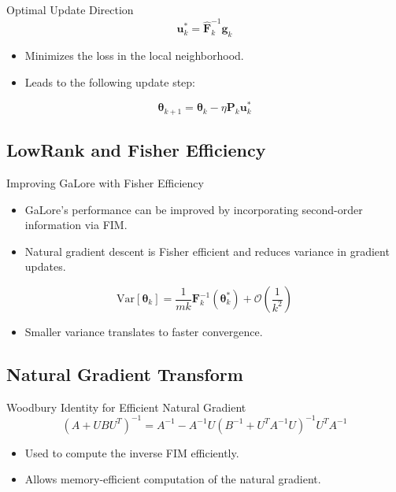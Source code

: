 \documentclass{beamer}
\begin{document}
\begin{frame}{Optimal Update Direction}
    \begin{equation}
        \mathbf{u}_k^* = \mathbf{\hat{F}}_k^{-1} \mathbf{g}_k
        \label{eq:optimal_direction}
    \end{equation}
    \begin{itemize}
        \item Minimizes the loss in the local neighborhood.
        \item Leads to the following update step:
    \end{itemize}
    \begin{equation}
        \mathbf{\theta}_{k+1} = \mathbf{\theta}_k - \eta \mathbf{P}_k \mathbf{u}_k^*
        \label{eq:gradient_descent_update}
    \end{equation}
\end{frame}

\subsection{LowRank and Fisher Efficiency}

\begin{frame}{Improving GaLore with Fisher Efficiency}
    \begin{itemize}
        \item GaLore’s performance can be improved by incorporating second-order information via FIM.
        \item Natural gradient descent is Fisher efficient and reduces variance in gradient updates.
    \end{itemize}
    \begin{equation}
        \text{Var}[\mathbf{\theta}_k] = \frac{1}{mk} \mathbf{F}_k^{-1}(\mathbf{\theta}_k^*) + \mathcal{O}\left(\frac{1}{k^2}\right)
        \label{eq:variance_reduction}
    \end{equation}
    \begin{itemize}
        \item Smaller variance translates to faster convergence.
    \end{itemize}
\end{frame}

\subsection{Natural Gradient Transform}

\begin{frame}{Woodbury Identity for Efficient Natural Gradient}
    \begin{equation}
        (A + UBU^T)^{-1} = A^{-1} - A^{-1}U(B^{-1} + U^TA^{-1}U)^{-1}U^TA^{-1}
    \end{equation}
    \begin{itemize}
        \item Used to compute the inverse FIM efficiently.
        \item Allows memory-efficient computation of the natural gradient.
    \end{itemize}
\end{frame}
\end{document}
